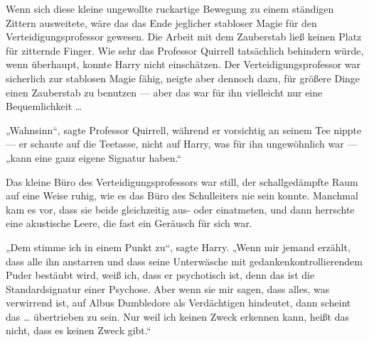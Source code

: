 Wenn sich diese kleine ungewollte ruckartige Bewegung zu einem ständigen Zittern ausweitete, wäre das das Ende jeglicher stabloser Magie für den Verteidigungsprofessor gewesen. Die Arbeit mit dem Zauberstab ließ keinen Platz für zitternde Finger. Wie sehr das Professor Quirrell tatsächlich behindern würde, wenn überhaupt, konnte Harry nicht einschätzen. Der Verteidigungsprofessor war sicherlich zur stablosen Magie fähig, neigte aber dennoch dazu, für größere Dinge einen Zauberstab zu benutzen — aber das war für ihn vielleicht nur eine Bequemlichkeit …

„Wahnsinn“, sagte Professor Quirrell, während er vorsichtig an seinem Tee nippte — er schaute auf die Teetasse, nicht auf Harry, was für ihn ungewöhnlich war — „kann eine ganz eigene Signatur haben.“

Das kleine Büro des Verteidigungsprofessors war still, der schallgedämpfte Raum auf eine Weise ruhig, wie es das Büro des Schulleiters nie sein konnte. Manchmal kam es vor, dass sie beide gleichzeitig aus- oder einatmeten, und dann herrschte eine akustische Leere, die fast ein Geräusch für sich war.

„Dem stimme ich in einem Punkt zu“, sagte Harry.
„Wenn mir jemand erzählt, dass alle ihn anstarren und dass seine Unterwäsche mit gedankenkontrollierendem Puder bestäubt wird, weiß ich, dass er psychotisch ist, denn das ist die Standardsignatur einer Psychose. Aber wenn sie mir sagen, dass alles, was verwirrend ist, auf Albus Dumbledore als Verdächtigen hindeutet, dann scheint das … übertrieben zu sein. Nur weil ich keinen Zweck erkennen kann, heißt das nicht, dass es keinen Zweck gibt.“


